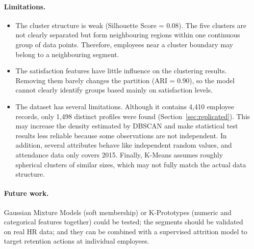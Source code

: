 \documentclass[12pt,a4paper]{article}
\begin{document}
\paragraph{Limitations.}
\begin{itemize}
  \item The cluster structure is weak (Silhouette Score = 0.08).
  The five clusters are not clearly separated but form neighbouring
  regions within one continuous group of data points. Therefore,
  employees near a cluster boundary may belong to a neighbouring
  segment.

  \item The satisfaction features have little influence on the
  clustering results. Removing them barely changes the partition
  (ARI = 0.90), so the model cannot clearly identify groups based
  mainly on satisfaction levels.

  \item The dataset has several limitations. Although it contains
  4,410 employee records, only 1,498 distinct profiles were found
  (Section~\ref{sec:replicated}). This may increase the density
  estimated by DBSCAN and make statistical test results less
  reliable because some observations are not independent.
  In addition, several attributes behave like independent random
  values, and attendance data only covers 2015. Finally, K-Means
  assumes roughly spherical clusters of similar sizes, which may
  not fully match the actual data structure.
\end{itemize}

\paragraph{Future work.} Gaussian Mixture Models (soft membership) or
K-Prototypes (numeric and categorical features together) could be tested; the
segments should be validated on real HR data; and they can be combined with a
supervised attrition model to target retention actions at individual
employees.


\clearpage
\listoffigures

\listoftables
\end{document}
